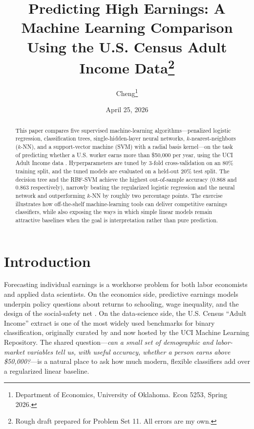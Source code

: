 \documentclass[12pt,english]{article}
\title{Predicting High Earnings: A Machine Learning Comparison Using the U.S. Census Adult Income Data\thanks{Rough draft prepared for Problem Set 11. All errors are my own.}}
\author{Cheng\thanks{Department of Economics, University of Oklahoma. Econ 5253, Spring 2026.}}
\date{April 25, 2026}
\begin{document}
\begin{singlespace}
\maketitle
\end{singlespace}

\begin{abstract}
\begin{singlespace}
This paper compares five supervised machine-learning algorithms---penalized
logistic regression, classification trees, single-hidden-layer neural networks,
$k$-nearest-neighbors ($k$-NN), and a support-vector machine (SVM) with a radial
basis kernel---on the task of predicting whether a U.S. worker earns more than
\$50{,}000 per year, using the UCI Adult Income data \citep{kohavi1996}.
Hyperparameters are tuned by 3-fold cross-validation on an 80\% training split,
and the tuned models are evaluated on a held-out 20\% test split. The decision
tree and the RBF-SVM achieve the highest out-of-sample accuracy
(0.868 and 0.863 respectively), narrowly beating the regularized logistic
regression and the neural network and outperforming $k$-NN by roughly two
percentage points. The exercise illustrates how off-the-shelf machine-learning
tools can deliver competitive earnings classifiers, while also exposing the
ways in which simple linear models remain attractive baselines when the goal
is interpretation rather than pure prediction.
\end{singlespace}
\end{abstract}
\vfill{}

\pagebreak{}

\section{Introduction}\label{sec:intro}

Forecasting individual earnings is a workhorse problem for both labor
economists and applied data scientists. On the economics side, predictive
earnings models underpin policy questions about returns to schooling, wage
inequality, and the design of the social-safety net \citep{mincer1974,card1999,blau2017}.
On the data-science side, the U.S. Census ``Adult Income'' extract is one of
the most widely used benchmarks for binary classification, originally curated
by \citet{kohavi1996} and now hosted by the UCI Machine Learning Repository.
The shared question---\textit{can a small set of demographic and labor-market
variables tell us, with useful accuracy, whether a person earns above
\$50{,}000?}---is a natural place to ask how much modern, flexible
classifiers add over a regularized linear baseline.
\end{document}
